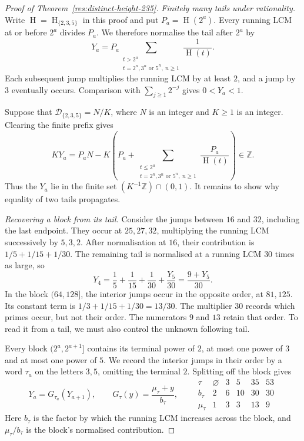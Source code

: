 \documentclass[11pt]{article}
\newcommand{\hgt}{\operatorname{H}}
\begin{document}
\begin{proof}[Proof of Theorem~\ref{res:distinct-height-235}]
\emph{Finitely many tails under rationality.}
Write $\hgt=\hgt_{\{2,3,5\}}$ in this proof and put $P_a=\hgt(2^a)$.
Every running LCM at or before $2^a$ divides $P_a$. We therefore normalise
the tail after $2^a$ by
\begin{equation}\label{eq:five-tail}
 Y_a=P_a\sum_{\substack{t>2^a\\t=2^n,3^n\text{ or }5^n,\ n\ge1}}
                   \frac1{\hgt(t)}.
\end{equation}
Each subsequent jump multiplies the running LCM by at least $2$, and a jump
by $3$ eventually occurs. Comparison with $\sum_{j\ge1}2^{-j}$ gives
$0<Y_a<1$.

Suppose that $\mathcal D_{\{2,3,5\}}=N/K$, where $N$ is an integer and
$K\ge1$ is an integer. Clearing the finite prefix gives
\[
 KY_a=P_aN-K\left(P_a+
        \sum_{\substack{t\le2^a\\t=2^n,3^n\text{ or }5^n,\ n\ge1}}
                 \frac{P_a}{\hgt(t)}\right)\in\mathbb Z.
\]
Thus the $Y_a$ lie in the finite set $(K^{-1}\mathbb Z)\cap(0,1)$.
It remains to show why equality of two tails propagates.

\medskip
\emph{Recovering a block from its tail.}
Consider the jumps between $16$ and $32$, including the last endpoint.
They occur at $25,27,32$, multiplying the running LCM successively by $5,3,2$.
After normalisation at $16$, their contribution is
$1/5+1/15+1/30$. The remaining tail is normalised at a running LCM $30$
times as large, so
\[
 Y_4=\frac15+\frac1{15}+\frac1{30}+\frac{Y_5}{30}
     =\frac{9+Y_5}{30}.
\]
In the block $(64,128]$, the interior jumps occur in the opposite order,
at $81,125$. Its constant term is $1/3+1/15+1/30=13/30$.
The multiplier $30$ records which primes occur, but not their order.
The numerators $9$ and $13$ retain that order. To read it from a tail,
we must also control the unknown following tail.

Every block $(2^a,2^{a+1}]$ contains its terminal power of $2$, at most
one power of $3$ and at most one power of $5$. We record the interior
jumps in their order by a word $\tau_a$ on the letters $3,5$, omitting
the terminal $2$. Splitting off the block gives
\begin{equation}\label{eq:five-maps}
 Y_a=G_{\tau_a}(Y_{a+1}),\qquad
 G_\tau(y)=\frac{\mu_\tau+y}{b_\tau},\qquad
 \begin{array}{c|ccccc}
 \tau&\varnothing&3&5&35&53\\\hline
 b_\tau&2&6&10&30&30\\
 \mu_\tau&1&3&3&13&9
 \end{array}
\end{equation}
Here $b_\tau$ is the factor by which the running LCM increases across the
block, and $\mu_\tau/b_\tau$ is the block's normalised contribution.


\end{proof}
\end{document}
